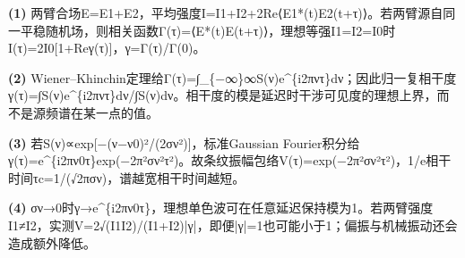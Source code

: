\par\noindent\textbf{(1)} 两臂合场E=E1+E2，平均强度I=I1+I2+2Re⟨E1*(t)E2(t+τ)⟩。若两臂源自同一平稳随机场，则相关函数Γ(τ)=⟨E*(t)E(t+τ)⟩，理想等强I1=I2=I0时I(τ)=2I0[1+Reγ(τ)]，γ=Γ(τ)/Γ(0)。
\par\noindent\textbf{(2)} Wiener–Khinchin定理给Γ(τ)=∫\_\{−∞\}∞S(ν)e\textasciicircum{}\{i2πντ\}dν；因此归一复相干度γ(τ)=∫S(ν)e\textasciicircum{}\{i2πντ\}dν/∫S(ν)dν。相干度的模是延迟时干涉可见度的理想上界，而不是源频谱在某一点的值。
\par\noindent\textbf{(3)} 若S(ν)∝exp[−(ν−ν0)²/(2σν²)]，标准Gaussian Fourier积分给γ(τ)=e\textasciicircum{}\{i2πν0τ\}exp(−2π²σν²τ²)。故条纹振幅包络V(τ)=exp(−2π²σν²τ²)，1/e相干时间τc=1/(√2πσν)，谱越宽相干时间越短。
\par\noindent\textbf{(4)} σν→0时γ→e\textasciicircum{}\{i2πν0τ\}，理想单色波可在任意延迟保持模为1。若两臂强度I1≠I2，实测V=2√(I1I2)/(I1+I2)|γ|，即便|γ|=1也可能小于1；偏振与机械振动还会造成额外降低。
